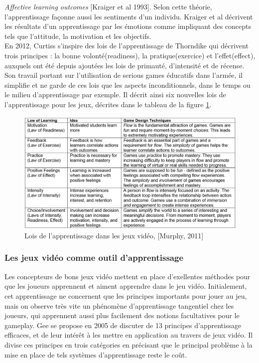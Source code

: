 \emph{Affective learning outcomes} [Kraiger et al 1993]. Selon cette théorie, l'apprentissage façonne aussi les sentiments d'un individu. Kraiger et al décrivent les résultats d'un apprentissage par les émotions comme impliquant des concepts tels que l'attitude, la motivation et les objectifs.\\

En 2012, Curtiss s'inspire des lois de l'apprentissage de Thorndike qui décrivent trois principes : la bonne volonté(readiness), la pratique(exercice) et l'effet(effect), auxquels ont été depuis ajoutées les lois de primauté, d'intensité et de récense. Son travail portant sur l'utilisation de serious games éducatifs dans l'armée, il simplifie et ne garde de ces lois que les aspects inconditionnels, dans le temps ou le milieu d'apprentissage par exemple. Il décrit ainsi six nouvelles lois de l'apprentissage pour les jeux, décrites dans le tableau de la figure \ref{laws_of_learning_for_games}.

\begin{figure}[h!]
	\includegraphics[width=1.1\linewidth]{images/laws_of_learning_for_games.png}
	\caption{Lois de l'apprentissage dans les jeux vidéo, [Murphy, 2011]\cite{Murp11}}
	\label{laws_of_learning_for_games}
\end{figure}

		\subsubsection*{Les jeux vidéo comme outil d'apprentissage}
Les concepteurs de bons jeux vidéo mettent en place d'exellentes méthodes pour que les joueurs apprennent et aiment apprendre dans le jeu vidéo. Initialement, cet apprentissage ne concernent que les principes importants pour jouer au jeu, mais on observe très vite un phénomène d'apprentissage tangentiel chez les joueurs, qui apprennent aussi plus facilement des notions facultatives pour le gameplay. Gee se propose en 2005 de discuter de 13 principes d'apprentissage efficaces, et de leur intérêt à les mettre en application au travers de jeux vidéo. Il divise ces principes en trois catégories en précisant que le principal problème à la mise en place de tels systèmes d'apprentissage reste le coût.
